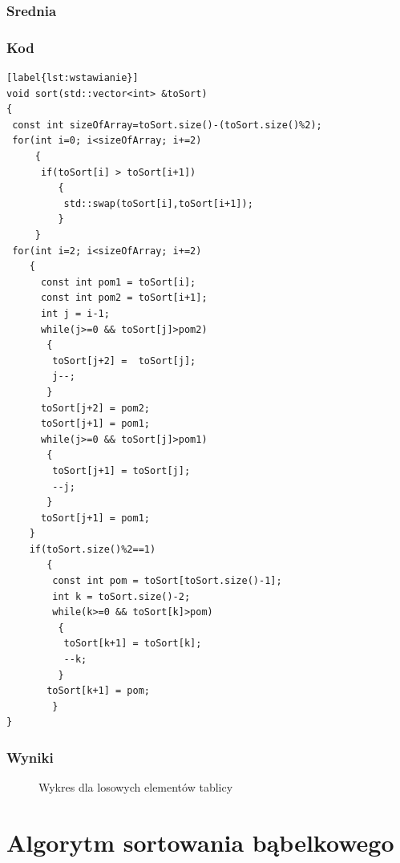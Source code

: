 \subsubsection*{Srednia}
\newpage
\subsubsection*{Kod}
\begin{lstlisting}[label{lst:wstawianie}]
void sort(std::vector<int> &toSort)
{
 const int sizeOfArray=toSort.size()-(toSort.size()%2);
 for(int i=0; i<sizeOfArray; i+=2)
     {
      if(toSort[i] > toSort[i+1])
         {
          std::swap(toSort[i],toSort[i+1]);
         }
     }
 for(int i=2; i<sizeOfArray; i+=2)
    {
      const int pom1 = toSort[i];
      const int pom2 = toSort[i+1];
      int j = i-1;
	  while(j>=0 && toSort[j]>pom2)
	   {
	    toSort[j+2] =  toSort[j];
	    j--;
	   }
	  toSort[j+2] = pom2;
	  toSort[j+1] = pom1;
	  while(j>=0 && toSort[j]>pom1)
	   {
	    toSort[j+1] = toSort[j];
	    --j;
	   }
	  toSort[j+1] = pom1;
	}
	if(toSort.size()%2==1)
	   {
	    const int pom = toSort[toSort.size()-1];
	    int k = toSort.size()-2;
	    while(k>=0 && toSort[k]>pom)
	     {
	      toSort[k+1] = toSort[k];
	      --k;
		 }
	   toSort[k+1] = pom;
	    }
}
\end{lstlisting}

\subsubsection*{Wyniki}
\begin{figure}[h!]
  \begin{center}
    \caption{Wykres dla losowych elementów tablicy}
  \end{center}
\end{figure}
\FloatBarrier

\section{Algorytm sortowania bąbelkowego}
